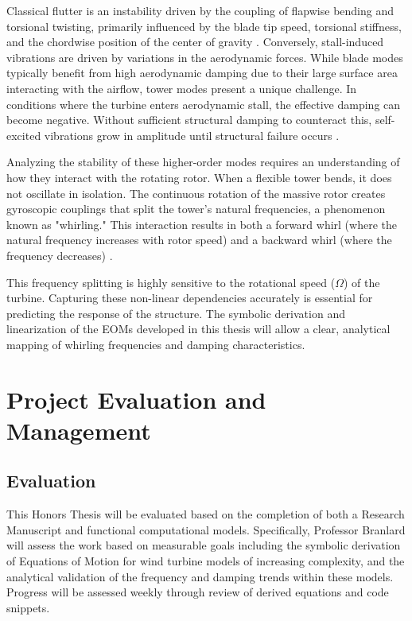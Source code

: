 \documentclass[onecolumn,draftcls]{IEEEtran}
\begin{document}
Classical flutter is an instability driven by the coupling of flapwise bending and torsional twisting, primarily influenced by the blade tip speed, torsional stiffness, and the chordwise position of the center of gravity \cite{hansen2007aeroelastic}. Conversely, stall-induced vibrations are driven by variations in the aerodynamic forces. While blade modes typically benefit from high aerodynamic damping due to their large surface area interacting with the airflow, tower modes present a unique challenge. In conditions where the turbine enters aerodynamic stall, the effective damping can become negative. Without sufficient structural damping to counteract this, self-excited vibrations grow in amplitude until structural failure occurs \cite{hansen2007aeroelastic}.

Analyzing the stability of these higher-order modes requires an understanding of how they interact with the rotating rotor. When a flexible tower bends, it does not oscillate in isolation. The continuous rotation of the massive rotor creates gyroscopic couplings that split the tower's natural frequencies, a phenomenon known as "whirling." This interaction results in both a forward whirl (where the natural frequency increases with rotor speed) and a backward whirl (where the frequency decreases) \cite{hansen2003improved}.

This frequency splitting is highly sensitive to the rotational speed ($\Omega$) of the turbine. Capturing these non-linear dependencies accurately is essential for predicting the response of the structure. The symbolic derivation and linearization of the EOMs developed in this thesis will allow a clear, analytical mapping of whirling frequencies and damping characteristics.

\section{Project Evaluation and Management}

\subsection{Evaluation}
This Honors Thesis will be evaluated based on the completion of both a Research Manuscript and functional computational models. Specifically, Professor Branlard will assess the work based on measurable goals including the symbolic derivation of Equations of Motion for wind turbine models of increasing complexity, and the analytical validation of the frequency and damping trends within these models. Progress will be assessed weekly through review of derived equations and code snippets.
\end{document}
